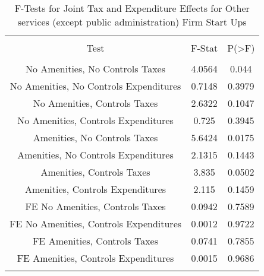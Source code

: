 
\begin{table}[!htbp] \centering 
  \caption{F-Tests for Joint Tax and Expenditure Effects for Other services (except public administration) Firm Start Ups} 
  \label{81Ftests} 
\begin{tabular}{@{\extracolsep{5pt}} ccc} 
\\[-1.8ex]\hline 
\hline \\[-1.8ex] 
Test & F-Stat & P(\textgreater F) \\ 
\hline \\[-1.8ex] 
No Amenities, No Controls Taxes & 4.0564 & 0.044 \\ 
No Amenities, No Controls Expenditures & 0.7148 & 0.3979 \\ 
No Amenities, Controls Taxes & 2.6322 & 0.1047 \\ 
No Amenities, Controls Expenditures & 0.725 & 0.3945 \\ 
Amenities, No Controls Taxes & 5.6424 & 0.0175 \\ 
Amenities, No Controls Expenditures & 2.1315 & 0.1443 \\ 
Amenities, Controls Taxes & 3.835 & 0.0502 \\ 
Amenities, Controls Expenditures & 2.115 & 0.1459 \\ 
FE No Amenities, Controls Taxes & 0.0942 & 0.7589 \\ 
FE No Amenities, Controls Expenditures & 0.0012 & 0.9722 \\ 
FE Amenities, Controls Taxes & 0.0741 & 0.7855 \\ 
FE Amenities, Controls Expenditures & 0.0015 & 0.9686 \\ 
\hline \\[-1.8ex] 
\end{tabular} 
\end{table} 
